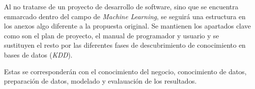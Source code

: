 Al no tratarse de un proyecto de desarrollo de software, sino que se encuentra enmarcado 
dentro del campo de \textit{Machine Learning}, se seguirá una estructura en los anexos algo diferente a la propuesta original.
Se mantienen los apartados clave como son el plan de proyecto, el manual de programador y usuario y se sustituyen el resto
por las diferentes fases de descubrimiento de conocimiento en bases de datos (\textit{KDD}).

Estas se corresponderán con el conocimiento del negocio, conocimiento de datos, preparación de datos, modelado y evalauación
de los resultados.